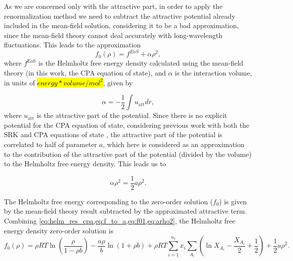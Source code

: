 \documentclass[preprint,12pt,3p]{elsarticle}
\begin{document}
As we are concerned only with the attractive part, in order to apply the renormalization method we need to subtract the attractive potential already included in the mean-field solution, considering it to be a bad approximation, since the mean-field theory cannot deal accurately with long-wavelength fluctuations.
This leads to the approximation
\begin{equation} \label{eq:f01}
f_{0}(\rho) = f^{EoS} + \alpha\rho^2,
\end{equation}
where $f^\text{EoS}$ is the Helmholtz free energy density calculated using the mean-field theory (in this work, the CPA equation of state), and $\alpha$ is the interaction volume, in units of \hl{$energy*volume/mol^{2}$}, given by

\begin{equation} \label{eq:alphav}
\alpha = -\frac{1}{2} \int u_\text{att} dr,
\end{equation}
where $u_\text{att}$ is the attractive part of the potential.
Since there is no explicit potential for the CPA equation of state, considering previous work with both the SRK and CPA equations of state \cite{cai2004thermodynamics, pcm2017application, xu2010crossover}, the attractive part of the potential is correlated to half of parameter $a$, which here is considered as an approximation to the contribution of the attractive part of the potential (divided by the volume) to the Helmholtz free energy density.
This leads us to

\begin{equation} \label{eq:arho2}
\alpha\rho^2 = \frac{1}{2}a\rho^2.
\end{equation}

The Helmholtz free energy corresponding to the zero-order solution ($f_{0}$) is given by the mean-field theory result subtracted by the approximated attractive term.
Combining \cref{eq:helm_res_cpa,eq:f_to_a,eq:f01,eq:arho2}, the Helmholtz free energy density zero-order solution is
\begin{equation} \label{eq:f00}
f_{0}(\rho) = \rho RT\ln\left(\frac{\rho}{1-\rho b}\right)-\frac{a\rho}{b}\ln(1+\rho b) + \rho RT\sum_{i=1}^{n_c} x_{i} \sum_{A_{i}}\left(\ln X_{A_{i}} - \frac{X_{A_{i}}}{2} + \frac{1}{2}\right) + \frac{1}{2} a\rho^2.
\end{equation}  
\end{document}
